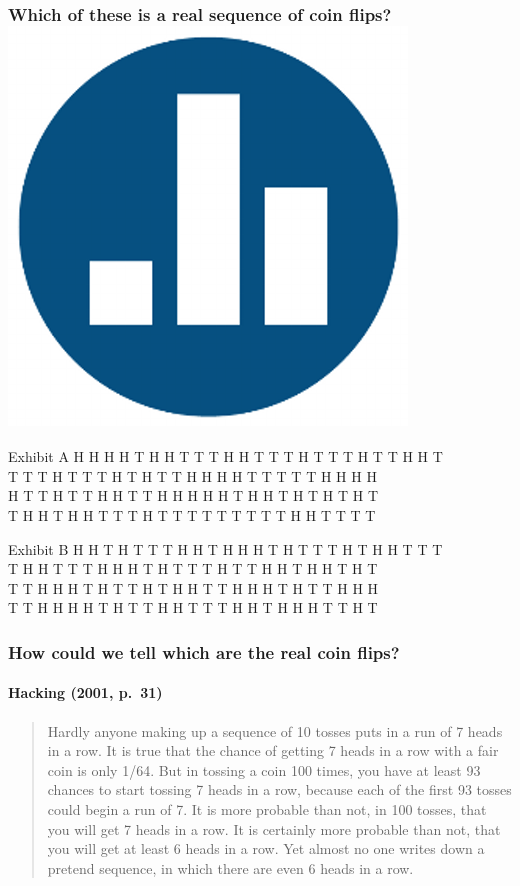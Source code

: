\documentclass[handout]{beamer}
\begin{document}
\begin{frame}[fragile]
\frametitle{Which of these is a real sequence of coin flips? \hfill \includegraphics[scale = 0.05]{./images/clicker}}
\small
\begin{block}{Exhibit A}
H H H H T H H T T T H H T T T H T T T H T T H H T \\
T T T H T T T H T H T T H H H H T T T T T H H H H \\
H T T H T T H H T T H H H H H T H H T H T H T H T \\
T H H T H H T T T H T T T T T T T T T H H T T T T 
\end{block}

\begin{block}{Exhibit B}
H H T H T T T H H T H H H T H T T T H T H H T T T\\
T H H T T T H H H T H T T T H T T H H T H H T H T\\
T T H H H T H T T H T H H T	T H H H T H T T H H H\\
T T H H H H T H T T H H T T T H H T H H H T T H T
\end{block}
\end{frame}
\begin{frame}
\frametitle{How could we tell which are the real coin flips?}
\framesubtitle{Hacking (2001, p.\ 31)}
	\begin{quote}
    Hardly anyone making up a sequence of 10 tosses puts in a run of 7 heads in a row. It is true that the chance of getting 7 heads in a row with a fair coin is only 1/64. But in tossing a coin 100 times, you have at least 93 chances to start tossing 7 heads in a row, because \alert{each of the first 93 tosses could begin a run of 7.} It is more probable than not, in 100 tosses, that you will get 7 heads in a row. It is certainly more probable than not, that you will get at least 6 heads in a row. Yet almost no one writes down a pretend sequence, in which there are even 6 heads in a row.
\end{quote}
\end{frame}
\end{document}

